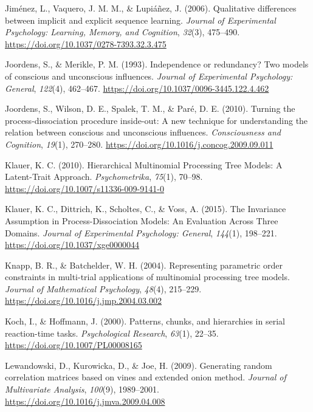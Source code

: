 \documentclass[english,,man]{apa6}
\begin{document}
\leavevmode\hypertarget{ref-jimenez_qualitative_2006}{}%
Jiménez, L., Vaquero, J. M. M., \& Lupiáñez, J. (2006). Qualitative differences between implicit and explicit sequence learning. \emph{Journal of Experimental Psychology: Learning, Memory, and Cognition}, \emph{32}(3), 475--490. \url{https://doi.org/10.1037/0278-7393.32.3.475}

\leavevmode\hypertarget{ref-joordens_independence_1993}{}%
Joordens, S., \& Merikle, P. M. (1993). Independence or redundancy? Two models of conscious and unconscious influences. \emph{Journal of Experimental Psychology: General}, \emph{122}(4), 462--467. \url{https://doi.org/10.1037/0096-3445.122.4.462}

\leavevmode\hypertarget{ref-joordens_turning_2010}{}%
Joordens, S., Wilson, D. E., Spalek, T. M., \& Paré, D. E. (2010). Turning the process-dissociation procedure inside-out: A new technique for understanding the relation between conscious and unconscious influences. \emph{Consciousness and Cognition}, \emph{19}(1), 270--280. \url{https://doi.org/10.1016/j.concog.2009.09.011}

\leavevmode\hypertarget{ref-klauer_hierarchical_2010}{}%
Klauer, K. C. (2010). Hierarchical Multinomial Processing Tree Models: A Latent-Trait Approach. \emph{Psychometrika}, \emph{75}(1), 70--98. \url{https://doi.org/10.1007/s11336-009-9141-0}

\leavevmode\hypertarget{ref-klauer_invariance_2015}{}%
Klauer, K. C., Dittrich, K., Scholtes, C., \& Voss, A. (2015). The Invariance Assumption in Process-Dissociation Models: An Evaluation Across Three Domains. \emph{Journal of Experimental Psychology: General}, \emph{144}(1), 198--221. \url{https://doi.org/10.1037/xge0000044}

\leavevmode\hypertarget{ref-knapp_representing_2004}{}%
Knapp, B. R., \& Batchelder, W. H. (2004). Representing parametric order constraints in multi-trial applications of multinomial processing tree models. \emph{Journal of Mathematical Psychology}, \emph{48}(4), 215--229. \url{https://doi.org/10.1016/j.jmp.2004.03.002}

\leavevmode\hypertarget{ref-koch_patterns_2000}{}%
Koch, I., \& Hoffmann, J. (2000). Patterns, chunks, and hierarchies in serial reaction-time tasks. \emph{Psychological Research}, \emph{63}(1), 22--35. \url{https://doi.org/10.1007/PL00008165}

\leavevmode\hypertarget{ref-lewandowski_generating_2009}{}%
Lewandowski, D., Kurowicka, D., \& Joe, H. (2009). Generating random correlation matrices based on vines and extended onion method. \emph{Journal of Multivariate Analysis}, \emph{100}(9), 1989--2001. \url{https://doi.org/10.1016/j.jmva.2009.04.008}
\end{document}
